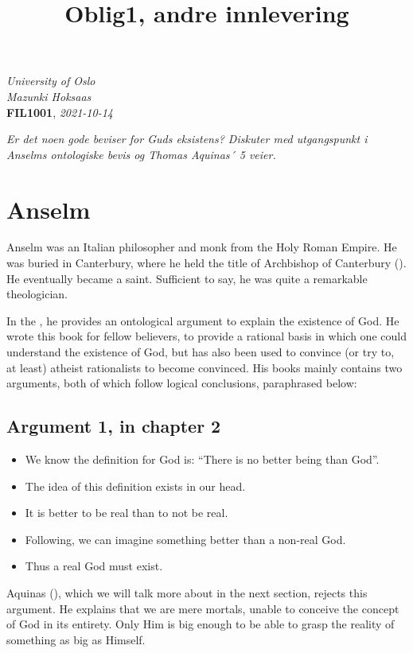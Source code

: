 \documentclass{article}
\begin{document}
	\begin{flushright}
		\textit{University of Oslo}
		\\\textit{Mazunki Hoksaas}
		\\\textbf{FIL1001}, \textit{2021-10-14}
	\end{flushright}

	\title*{\Large Oblig1, andre innlevering}
	
	\textit{Er det noen gode beviser for Guds eksistens? Diskuter med utgangspunkt i Anselms ontologiske bevis og Thomas Aquinas´ 5 veier.}

	\section*{Anselm}
	Anselm was an Italian philosopher and monk from the Holy Roman Empire. He was buried in Canterbury, where he held the title of Archbishop of Canterbury (\cite{burr1996}). He eventually became a saint. Sufficient to say, he was quite a remarkable theologician.

	In the \cite{anselm1078}, he provides an ontological argument to explain the existence of God. He wrote this book for fellow believers, to provide a rational basis in which one could understand the existence of God, but has also been used to convince (or try to, at least) atheist rationalists to become convinced. His books mainly contains two arguments, both of which follow logical conclusions, paraphrased below:
	
	\subsection*{Argument 1, in chapter 2}
	\begin{itemize}
		\item We know the definition for God is: ``There is no better being than God''.
		\item The idea of this definition exists in our head.
		\item It is better to be real than to not be real.
		\item Following, we can imagine something better than a non-real God.
		\item Thus a real God must exist.
	\end{itemize}

	Aquinas (\citeyear{aquinas1485}), which we will talk more about in the next section, rejects this argument. He explains that we are mere mortals, unable to conceive the concept of God in its entirety. Only Him is big enough to be able to grasp the reality of something as big as Himself.
\end{document}
